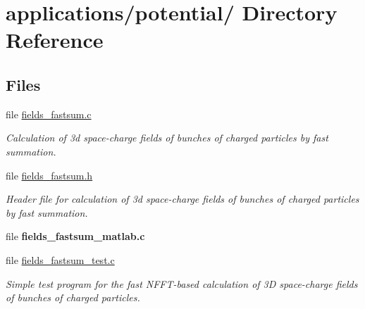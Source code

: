\hypertarget{dir_000017}{
\section{applications/potential/ Directory Reference}
\label{dir_000017}
}
\subsection*{Files}
\begin{CompactItemize}
\item 
file \hyperlink{fields__fastsum_8c}{fields\_\-fastsum.c}
\begin{CompactList}\small\item\em Calculation of 3d space-charge fields of bunches of charged particles by fast summation. \item\end{CompactList}

\item 
file \hyperlink{fields__fastsum_8h}{fields\_\-fastsum.h}
\begin{CompactList}\small\item\em Header file for calculation of 3d space-charge fields of bunches of charged particles by fast summation. \item\end{CompactList}

\item 
file {\bf fields\_\-fastsum\_\-matlab.c}
\item 
file \hyperlink{fields__fastsum__test_8c}{fields\_\-fastsum\_\-test.c}
\begin{CompactList}\small\item\em Simple test program for the fast NFFT-based calculation of 3D space-charge fields of bunches of charged particles. \item\end{CompactList}

\end{CompactItemize}
